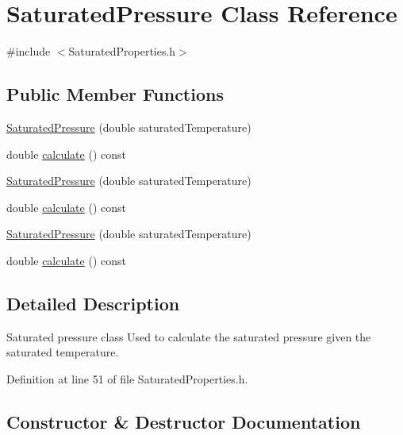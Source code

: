 \hypertarget{class_saturated_pressure}{}\section{Saturated\+Pressure Class Reference}
\label{class_saturated_pressure}


{\ttfamily \#include $<$Saturated\+Properties.\+h$>$}

\subsection*{Public Member Functions}
\begin{DoxyCompactItemize}
\item 
\hyperlink{class_saturated_pressure_a67020b0bb7588c643e12e256fa25e0bc}{Saturated\+Pressure} (double saturated\+Temperature)
\item 
double \hyperlink{class_saturated_pressure_a8ef5357b4f8af1aeaa8dde6ae05b9daa}{calculate} () const
\item 
\hyperlink{class_saturated_pressure_a67020b0bb7588c643e12e256fa25e0bc}{Saturated\+Pressure} (double saturated\+Temperature)
\item 
double \hyperlink{class_saturated_pressure_a8ef5357b4f8af1aeaa8dde6ae05b9daa}{calculate} () const
\item 
\hyperlink{class_saturated_pressure_a67020b0bb7588c643e12e256fa25e0bc}{Saturated\+Pressure} (double saturated\+Temperature)
\item 
double \hyperlink{class_saturated_pressure_a8ef5357b4f8af1aeaa8dde6ae05b9daa}{calculate} () const
\end{DoxyCompactItemize}


\subsection{Detailed Description}
Saturated pressure class Used to calculate the saturated pressure given the saturated temperature. 

Definition at line 51 of file Saturated\+Properties.\+h.



\subsection{Constructor \& Destructor Documentation}
\mbox{\label{class_saturated_pressure_a67020b0bb7588c643e12e256fa25e0bc}} 
